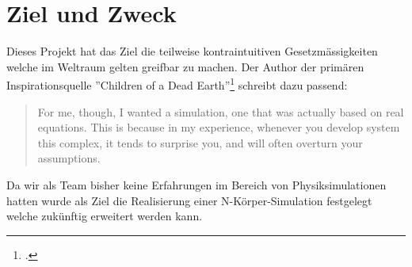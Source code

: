 \chapter{Ziel und Zweck}

Dieses Projekt hat das Ziel die teilweise kontraintuitiven Gesetzmässigkeiten welche im Weltraum gelten greifbar zu machen.
Der Author der primären Inspirationsquelle ''Children of a Dead Earth''\footcite{COADE:1} schreibt dazu passend:
\begin{quote}
	For me, though, I wanted a simulation, one that was actually based on real equations. This is because in my experience, whenever you develop system this complex, it tends to surprise you, and will often overturn your assumptions.
\end{quote}

Da wir als Team bisher keine Erfahrungen im Bereich von Physiksimulationen hatten wurde als Ziel die Realisierung einer N-Körper-Simulation festgelegt welche zukünftig erweitert werden kann.


